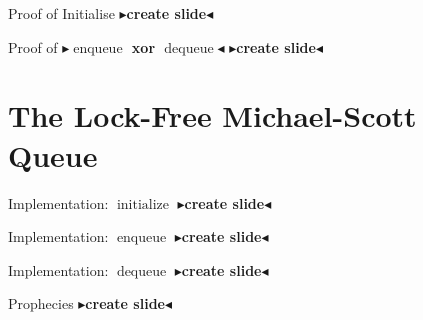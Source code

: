 \documentclass[9pt]{beamer}
\newcommand{\initialise}{\operatorname{initialize}}
\newcommand{\enqueue}{\operatorname{enqueue}}
\newcommand{\dequeue}{\operatorname{dequeue}}
\newcommand{\todo}[1]{{\color[rgb]{.5,0,0}\textbf{$\blacktriangleright$#1$\blacktriangleleft$}}}
\begin{document}
\begin{frame}{Proof of Initialise}
  \todo{create slide}
\end{frame}

\begin{frame}{Proof of \todo{$\enqueue$ xor $\dequeue$} }
  \todo{create slide}
\end{frame}


\section{The Lock-Free Michael-Scott Queue}

\begin{frame}{Implementation: $\initialise$}
  \todo{create slide}
\end{frame}

\begin{frame}{Implementation: $\enqueue$}
  \todo{create slide}
\end{frame}

\begin{frame}{Implementation: $\dequeue$}
  \todo{create slide}
\end{frame}

\begin{frame}{Prophecies}
  \todo{create slide}
\end{frame}
\end{document}
